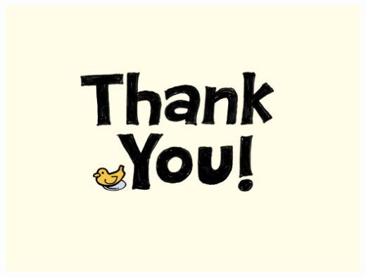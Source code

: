 \documentclass{beamer}
\begin{document}
\begin{CJK}{UTF8}{bkai}
\begin{frame}
	\begin{center}
		\includegraphics[width=\textwidth]{thank_you.jpg}
	\end{center}	
\end{frame}

\end{CJK}
\end{document}
